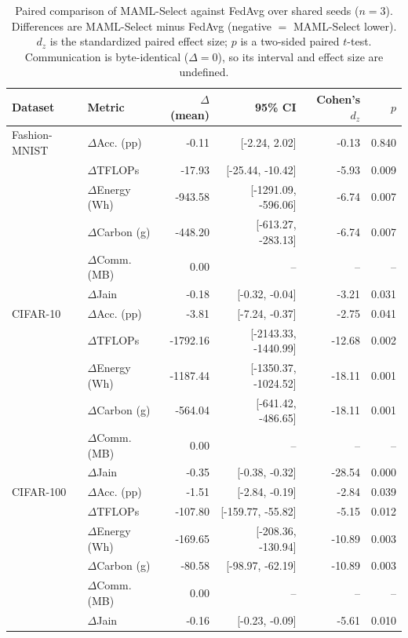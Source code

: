 \documentclass[10pt]{article}
\begin{document}
\begin{table}[!ht]
\centering
\caption{Paired comparison of MAML-Select against FedAvg over shared seeds ($n=3$). Differences are MAML-Select minus FedAvg (negative $=$ MAML-Select lower). $d_z$ is the standardized paired effect size; $p$ is a two-sided paired $t$-test. Communication is byte-identical ($\Delta=0$), so its interval and effect size are undefined.}
\label{tab:supp_stats}
\small
\begin{tabular}{@{}llrrrr@{}}
\toprule
Dataset & Metric & $\Delta$ (mean) & 95\% CI & Cohen's $d_z$ & $p$ \\
\midrule
Fashion-MNIST & $\Delta$Acc. (pp) & -0.11 & [-2.24, 2.02] & -0.13 & 0.840 \\
 & $\Delta$TFLOPs & -17.93 & [-25.44, -10.42] & -5.93 & 0.009 \\
 & $\Delta$Energy (Wh) & -943.58 & [-1291.09, -596.06] & -6.74 & 0.007 \\
 & $\Delta$Carbon (g) & -448.20 & [-613.27, -283.13] & -6.74 & 0.007 \\
 & $\Delta$Comm. (MB) & 0.00 & -- & -- & -- \\
 & $\Delta$Jain & -0.18 & [-0.32, -0.04] & -3.21 & 0.031 \\
\midrule
CIFAR-10 & $\Delta$Acc. (pp) & -3.81 & [-7.24, -0.37] & -2.75 & 0.041 \\
 & $\Delta$TFLOPs & -1792.16 & [-2143.33, -1440.99] & -12.68 & 0.002 \\
 & $\Delta$Energy (Wh) & -1187.44 & [-1350.37, -1024.52] & -18.11 & 0.001 \\
 & $\Delta$Carbon (g) & -564.04 & [-641.42, -486.65] & -18.11 & 0.001 \\
 & $\Delta$Comm. (MB) & 0.00 & -- & -- & -- \\
 & $\Delta$Jain & -0.35 & [-0.38, -0.32] & -28.54 & 0.000 \\
\midrule
CIFAR-100 & $\Delta$Acc. (pp) & -1.51 & [-2.84, -0.19] & -2.84 & 0.039 \\
 & $\Delta$TFLOPs & -107.80 & [-159.77, -55.82] & -5.15 & 0.012 \\
 & $\Delta$Energy (Wh) & -169.65 & [-208.36, -130.94] & -10.89 & 0.003 \\
 & $\Delta$Carbon (g) & -80.58 & [-98.97, -62.19] & -10.89 & 0.003 \\
 & $\Delta$Comm. (MB) & 0.00 & -- & -- & -- \\
 & $\Delta$Jain & -0.16 & [-0.23, -0.09] & -5.61 & 0.010 \\
\bottomrule
\end{tabular}
\end{table}
\end{document}
